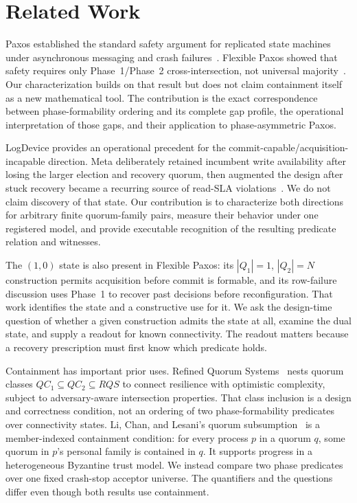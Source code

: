 \documentclass[letterpaper,twocolumn,10pt]{article}
\newcounter{prop}
\newcounter{cor}
\begin{document}
\section{Related Work}

Paxos established the standard safety argument for replicated state machines under asynchronous messaging and crash failures~\cite{lamport1998}. Flexible Paxos showed that safety requires only Phase~1/Phase~2 cross-intersection, not universal majority~\cite{howard2016}. Our characterization builds on that result but does not claim containment itself as a new mathematical tool. The contribution is the exact correspondence between phase-formability ordering and its complete gap profile, the operational interpretation of those gaps, and their application to phase-asymmetric Paxos.

LogDevice provides an operational precedent for the commit-capable/acquisition-incapable direction. Meta deliberately retained incumbent write availability after losing the larger election and recovery quorum, then augmented the design after stuck recovery became a recurring source of read-SLA violations~\cite{meta2022logdevice}. We do not claim discovery of that state. Our contribution is to characterize both directions for arbitrary finite quorum-family pairs, measure their behavior under one registered model, and provide executable recognition of the resulting predicate relation and witnesses.

The $(1,0)$ state is also present in Flexible Paxos: its $|Q_1|{=}1$, $|Q_2|{=}N$ construction permits acquisition before commit is formable, and its row-failure discussion uses Phase~1 to recover past decisions before reconfiguration. That work identifies the state and a constructive use for it. We ask the design-time question of whether a given construction admits the state at all, examine the dual state, and supply a readout for known connectivity. The readout matters because a recovery prescription must first know which predicate holds.

Containment has important prior uses. Refined Quorum Systems~\cite{guerraoui2010rqs} nests quorum classes $QC_1 \subseteq QC_2 \subseteq RQS$ to connect resilience with optimistic complexity, subject to adversary-aware intersection properties. That class inclusion is a design and correctness condition, not an ordering of two phase-formability predicates over connectivity states. Li, Chan, and Lesani's quorum subsumption~\cite{li2023} is a member-indexed containment condition: for every process $p$ in a quorum $q$, some quorum in $p$'s personal family is contained in $q$. It supports progress in a heterogeneous Byzantine trust model. We instead compare two phase predicates over one fixed crash-stop acceptor universe. The quantifiers and the questions differ even though both results use containment.
\end{document}
